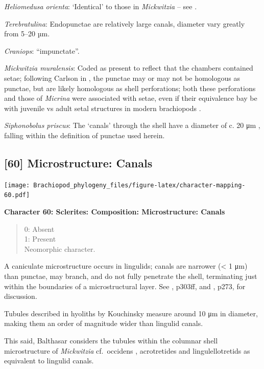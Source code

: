\documentclass[]{book}
\theoremstyle{definition}
\theoremstyle{definition}
\theoremstyle{definition}
\theoremstyle{remark}
\begin{document}
\emph{Heliomedusa orienta}: `Identical' to those in \emph{Mickwitzia} --
see \citet{Williams2007PartH}.

\emph{Terebratulina}: Endopunctae are relatively large canals, diameter
vary greatly from 5--20 µm.

\emph{Craniops}: ``impunctate''.

\emph{Mickwitzia muralensis}: Coded as present to reflect that the
chambers contained setae; following Carlson in
\citet{Williams2007PartH}, the punctae may or may not be homologous as
punctae, but are likely homologous as shell perforations; both these
perforations and those of \emph{Micrina} were associated with setae,
even if their equivalence bay be with juvenile vs adult setal structures
in modern brachiopods \citep[p.~397]{Balthasar2004Shellstructure}.

\emph{Siphonobolus priscus}: The `canals' through the shell have a
diameter of c. 20 μm \citep[text-fig. 2a]{Williams2004Chemicostructure},
falling within the definition of punctae used herein.

\hypertarget{microstructure-canals}{%
\subsection*{{[}60{]} Microstructure:
Canals}\label{microstructure-canals}}

\texttt{[image: Brachiopod\_phylogeny\_files/figure-latex/character-mapping-60.pdf]}

\textbf{Character 60: Sclerites: Composition: Microstructure: Canals}

\begin{quote}
0: Absent\\
1: Present\\
Neomorphic character.
\end{quote}

A caniculate microstructure occurs in lingulids; canals are narrower
(\textless{} 1 μm) than punctae, may branch, and do not fully penetrate
the shell, terminating just within the boundaries of a microstructural
layer. See \citet{Williams1997BrachiopodaRevised}, p303ff, and
\citet{Balthasar2008iMummpikia}, p273, for discussion.

Tubules described in hyoliths by Kouchinsky
\citeyearpar{Kouchinsky2000Skeletalmicrostructures} measure around 10 μm
in diameter, making them an order of magnitude wider than lingulid
canals.

This said, Balthasar \citeyearpar{Balthasar2008iMummpikia} considers the
tubules within the columnar shell microstructure of \emph{Mickwitzia}
cf.~occidens \citep[1--3 μm wide,][]{Skovsted2003EarlyCambrian},
acrotretides \citep[1 μm wide,
see][\citet{Zhang2016Epithelialcell}]{Holmer1989MiddleOrdovician} and
lingulellotretids \citep[100 nm wide,][]{Cusack1999Chemicostructural} as
equivalent to lingulid canals.
\end{document}
